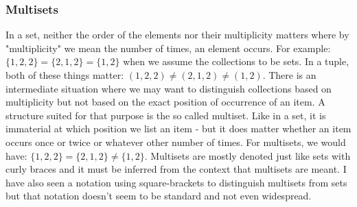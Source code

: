



\subsubsection{Multisets}
In a set, neither the order of the elements nor their multiplicity matters where by "multiplicity" we mean the number of times, an element occurs. For example: $\{ 1,2,2 \} = \{ 2,1,2 \} = \{ 1,2 \}$ when we assume the collections to be sets. In a tuple, both of these things matter: $(1,2,2) \neq (2,1,2) \neq (1,2)$. There is an intermediate situation where we may want to distinguish collections based on multiplicity but not based on the exact position of occurrence of an item. A structure suited for that purpose is the so called multiset. Like in a set, it is immaterial at which position we list an item - but it does matter whether an item occurs once or twice or whatever other number of times. For multisets, we would have: $\{ 1,2,2 \} = \{ 2,1,2 \} \neq \{ 1,2 \}$. Multisets are mostly denoted just like sets with curly braces and it must be inferred from the context that multisets are meant. I have also seen a notation using square-brackets to distinguish multisets from sets but that notation doesn't seem to be standard and not even widespread.




